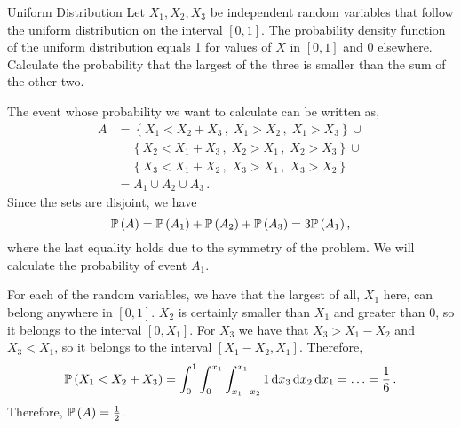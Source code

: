\documentclass[10pt,english,solution]{exam-uoc}
\begin{document}
\begin{question}[20]{Uniform Distribution}
%
Let $X_1, X_2, X_3$ be independent random variables that follow the uniform 
distribution on the interval $[0, 1]$. The probability density function of the uniform 
distribution equals 1 for values of $X$ in $[0, 1]$ and 0 elsewhere.
Calculate the probability that the largest of the three is smaller than the 
sum of the other two.

\begin{solution}
%
The event whose probability we want to calculate can be written as,
%
\begin{equation}
\begin{split}
    A 
    &= \left\{ X_1 < X_2 + X_3\,,\; X_1 > X_2\,,\; X_1>X_3 \right\} \cup 
    \\
    & \quad\, \left\{ X_2 < X_1 + X_3\,,\; X_2 > X_1\,,\; X_2 > X_3 \right\} \cup 
    \\
    & \quad\, \left\{ X_3 < X_1 + X_2\,,\; X_3 > X_1\,,\; X_3 > X_2 \right\} \\
    &=
    A_1 \cup A_2 \cup A_3 \,.
\end{split}
\end{equation}
%
Since the sets are disjoint, we have
%
\begin{equation}
    \Prob(A) = 
    \Prob(A_1) + \Prob(A_2) + \Prob(A_3) =
     3\Prob(A_1)\,,
\end{equation}
%
where the last equality holds due to the symmetry of the problem.
We will calculate the probability of event $A_1$.

For each of the random variables, we have that the largest of all, $X_1$ here, can
belong anywhere in $[0,1]$.  
$X_2$ is certainly smaller than $X_1$ and greater than 0, so it belongs to the 
interval $[0, X_1]$. 
For $X_3$ we have that $X_3 > X_1 - X_2$ and $X_3<X_1$, so it belongs to the interval 
$[X_1 - X_2, X_1]$.
Therefore, 
%
%
\begin{equation}
    \Prob(X_1 < X_2 + X_3)
    = \int_0^1 \int_0^{x_1} \int_{x_1 - x_2}^{x_1} 1 \dif x_3 \dif x_2 \dif x_1
    = \ldots = \frac{1}{6} \,.
\end{equation}
%
Therefore, $\Prob(A) = \frac{1}{2}$.
%
\end{solution}

\end{question}


\newpage\thispagestyle{empty}
\end{document}
